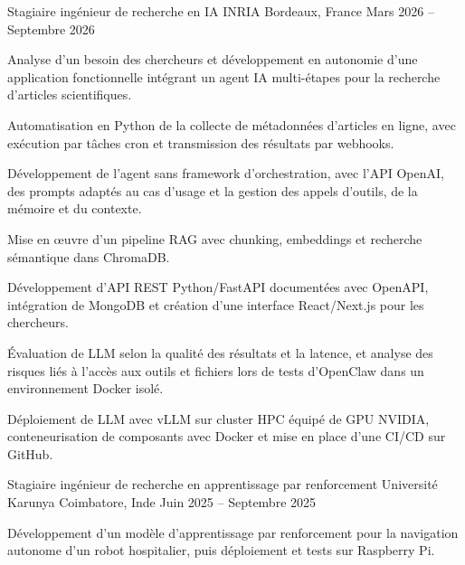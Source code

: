 
\begin{cventries}
  \cventry
    {Stagiaire ingénieur de recherche en IA}
    {INRIA}
    {Bordeaux, France}
    {Mars 2026 -- Septembre 2026}
    {
      \begin{cvitems}
        \item {Analyse d’un besoin des chercheurs et développement en autonomie d’une application fonctionnelle intégrant un agent IA multi-étapes pour la recherche d’articles scientifiques.}
        \item {Automatisation en Python de la collecte de métadonnées d’articles en ligne, avec exécution par tâches cron et transmission des résultats par webhooks.}
        \item {Développement de l’agent sans framework d’orchestration, avec l’API OpenAI, des prompts adaptés au cas d’usage et la gestion des appels d’outils, de la mémoire et du contexte.}
        \item {Mise en œuvre d’un pipeline RAG avec chunking, embeddings et recherche sémantique dans ChromaDB.}
        \item {Développement d’API REST Python/FastAPI documentées avec OpenAPI, intégration de MongoDB et création d’une interface React/Next.js pour les chercheurs.}
        \item {Évaluation de LLM selon la qualité des résultats et la latence, et analyse des risques liés à l’accès aux outils et fichiers lors de tests d’OpenClaw dans un environnement Docker isolé.}
        \item {Déploiement de LLM avec vLLM sur cluster HPC équipé de GPU NVIDIA, conteneurisation de composants avec Docker et mise en place d’une CI/CD sur GitHub.}
      \end{cvitems}
    }

  \cventry
    {Stagiaire ingénieur de recherche en apprentissage par renforcement}
    {Université Karunya}
    {Coimbatore, Inde}
    {Juin 2025 -- Septembre 2025}
    {
      \begin{cvitems}
        \item {Développement d’un modèle d’apprentissage par renforcement pour la navigation autonome d’un robot hospitalier, puis déploiement et tests sur Raspberry Pi.}
      \end{cvitems}
    }
\end{cventries}
